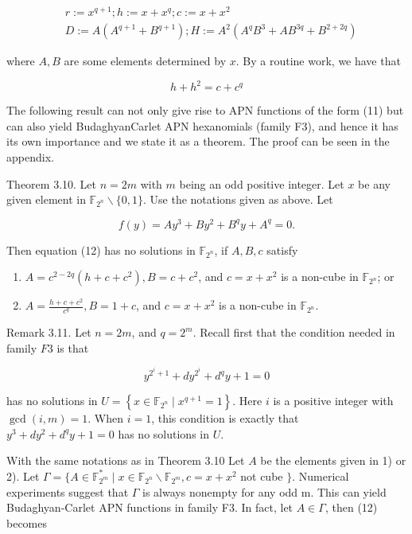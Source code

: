 \documentclass[10pt]{article}
\begin{document}
$$
\begin{aligned}
& r:=x^{q+1} ; h:=x+x^{q} ; c:=x+x^{2} \\
& D:=A\left(A^{q+1}+B^{q+1}\right) ; H:=A^{2}\left(A^{q} B^{3}+A B^{3 q}+B^{2+2 q}\right)
\end{aligned}
$$

where $A, B$ are some elements determined by $x$. By a routine work, we have that

$$
h+h^{2}=c+c^{q}
$$

The following result can not only give rise to APN functions of the form (11) but can also yield BudaghyanCarlet APN hexanomials (family F3), and hence it has its own importance and we state it as a theorem. The proof can be seen in the appendix.

Theorem 3.10. Let $n=2 m$ with $m$ being an odd positive integer. Let $x$ be any given element in $\mathbb{F}_{2^{n}} \backslash\{0,1\}$. Use the notations given as above. Let


\begin{equation*}
f(y)=A y^{3}+B y^{2}+B^{q} y+A^{q}=0 . \tag{12}
\end{equation*}


Then equation (12) has no solutions in $\mathbb{F}_{2^{n}}$, if $A, B, c$ satisfy

\begin{enumerate}
  \item $A=c^{2-2 q}\left(h+c+c^{2}\right), B=c+c^{2}$, and $c=x+x^{2}$ is a non-cube in $\mathbb{F}_{2^{n}}$; or
  \item $A=\frac{h+c+c^{2}}{c^{q}}, B=1+c$, and $c=x+x^{2}$ is a non-cube in $\mathbb{F}_{2^{n}}$.
\end{enumerate}

Remark 3.11. Let $n=2 m$, and $q=2^{m}$. Recall first that the condition needed in family $F 3$ is that


\begin{equation*}
y^{2^{i}+1}+d y^{2^{i}}+d^{q} y+1=0 \tag{13}
\end{equation*}


has no solutions in $U=\left\{x \in \mathbb{F}_{2^{n}} \mid x^{q+1}=1\right\}$. Here $i$ is a positive integer with $\operatorname{gcd}(i, m)=1$. When $i=1$, this condition is exactly that $y^{3}+d y^{2}+d^{q} y+1=0$ has no solutions in $U$.

With the same notations as in Theorem 3.10 Let $A$ be the elements given in 1) or 2). Let $\Gamma=\{A \in \mathbb{F}_{2^{m}}^{*} \mid x \in \mathbb{F}_{2^{n}} \backslash \mathbb{F}_{2^{m}}, c=x+x^{2}$ not cube $\}$. Numerical experiments suggest that $\Gamma$ is always nonempty for any odd m. This can yield Budaghyan-Carlet APN functions in family F3. In fact, let $A \in \Gamma$, then (12) becomes
\end{document}
